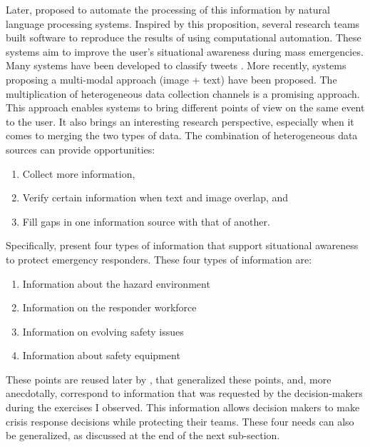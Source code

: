Later, \textcite{vermaNaturalLanguageProcessing2011} proposed to automate the processing of this information by natural language processing systems.
Inspired by this proposition, several research teams built software to reproduce the results of \citeauthor{viewegSituationalAwarenessMass2012} using computational automation.
These systems aim to improve the user's situational awareness during mass emergencies.
Many systems have been developed to classify tweets \parencite{carageaClassifyingTextMessages2011, imranAIDRArtificialIntelligence2014,ashktorabTweedrMiningTwitter2014}.
More recently, systems proposing a multi-modal approach (image + text) have been proposed.
The multiplication of heterogeneous data collection channels is a promising approach.
This approach enables systems to bring different points of view on the same event to the user.
It also brings an interesting research perspective, especially when it comes to merging the two types of data.
The combination of heterogeneous data sources can provide opportunities:

\begin{enumerate}
    \item Collect more information,
    \item Verify certain information when text and image overlap, and
    \item Fill gaps in one information source with that of another.
\end{enumerate}

Specifically, \textcite{jacksonInformationSharingEmergency2006} present four types of information that support situational awareness to protect emergency responders.
These four types of information are:

\begin{enumerate}
    \item Information about the hazard environment
    \item Information on the responder workforce
    \item Information on evolving safety issues
    \item Information about safety equipment
\end{enumerate}

These points are reused later by \textcite{yangDesignPrinciplesIntegrated2012}, that generalized these points, and, more anecdotally, correspond to information that was requested by the decision-makers during the exercises I observed.
This information allows decision makers to make crisis response decisions while protecting their teams.
These four needs can also be generalized, as discussed at the end of the next sub-section.

